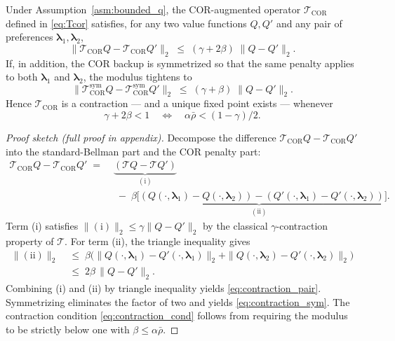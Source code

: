 \begin{theorem}
\label{thm:cor_contraction}
Under Assumption~\ref{asm:bounded_q}, the COR-augmented operator
$\mathcal{T}_{\text{COR}}$ defined in \eqref{eq:Tcor} satisfies, for any
two value functions $Q,Q'$ and any pair of preferences $\bm{\lambda}_1,
\bm{\lambda}_2$,
\begin{equation}
\label{eq:contraction_pair}
\big\|\mathcal{T}_{\text{COR}}Q - \mathcal{T}_{\text{COR}}Q'\big\|_2
\;\le\;
(\gamma + 2\beta)\;\|Q - Q'\|_2.
\end{equation}
If, in addition, the COR backup is symmetrized so that the same
penalty applies to both $\bm{\lambda}_1$ and $\bm{\lambda}_2$, the
modulus tightens to
\begin{equation}
\label{eq:contraction_sym}
\big\|\mathcal{T}_{\text{COR}}^{\mathrm{sym}}Q
       - \mathcal{T}_{\text{COR}}^{\mathrm{sym}}Q'\big\|_2
\;\le\;
(\gamma + \beta)\;\|Q - Q'\|_2.
\end{equation}
Hence $\mathcal{T}_{\text{COR}}$ is a contraction --- and a unique fixed
point exists --- whenever
\begin{equation}
\label{eq:contraction_cond}
\gamma + 2\beta < 1
\quad\Longleftrightarrow\quad
\alpha\bar{\rho} < (1-\gamma)/2.
\end{equation}
\end{theorem}

\begin{proof}[Proof sketch (full proof in appendix)]
Decompose the difference $\mathcal{T}_{\text{COR}}Q -
\mathcal{T}_{\text{COR}}Q'$ into the standard-Bellman part and the COR
penalty part:
\begin{align*}
\mathcal{T}_{\text{COR}}Q - \mathcal{T}_{\text{COR}}Q' \;=\;&
\underbrace{(\mathcal{T}Q - \mathcal{T}Q')}_{(\text{i})} \\
&\;-\;
\underbrace{\beta\big[(Q(\cdot,\bm{\lambda}_1)-Q(\cdot,\bm{\lambda}_2))
                     -(Q'(\cdot,\bm{\lambda}_1)-Q'(\cdot,\bm{\lambda}_2))
            \big]}_{(\text{ii})}.
\end{align*}
Term (i) satisfies $\|(\text{i})\|_2 \le \gamma\|Q-Q'\|_2$ by the
classical $\gamma$-contraction property of $\mathcal{T}$. For term
(ii), the triangle inequality gives
\begin{align*}
\|(\text{ii})\|_2
\;&\le\;
\beta\big(
\|Q(\cdot,\bm{\lambda}_1) - Q'(\cdot,\bm{\lambda}_1)\|_2
+
\|Q(\cdot,\bm{\lambda}_2) - Q'(\cdot,\bm{\lambda}_2)\|_2
\big)\\
\;&\le\;
2\beta\,\|Q - Q'\|_2.
\end{align*}
Combining (i) and (ii) by triangle inequality yields
\eqref{eq:contraction_pair}. Symmetrizing eliminates the factor of two
and yields \eqref{eq:contraction_sym}. The contraction condition
\eqref{eq:contraction_cond} follows from requiring the modulus to be
strictly below one with $\beta\le\alpha\bar{\rho}$.
\end{proof}

